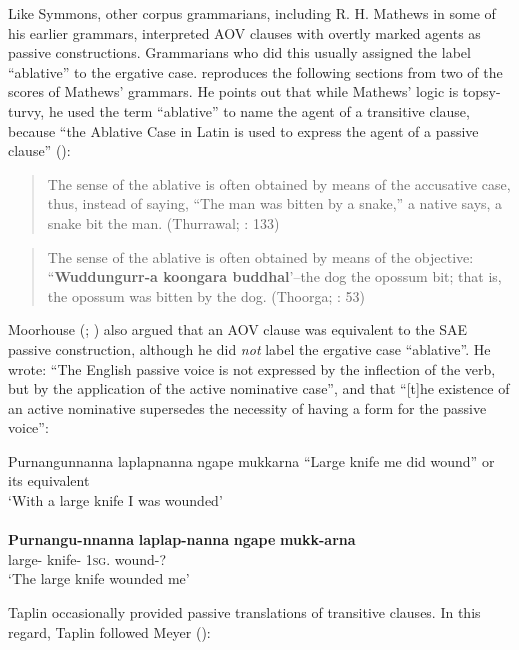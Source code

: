 Like Symmons, other corpus grammarians, including R. H. Mathews in some of his earlier grammars, interpreted AOV clauses with overtly marked agents as passive constructions. Grammarians who did this usually assigned the label “ablative” to the ergative case. \citet[193]{koch_r_2008} reproduces the following sections from two of the scores of Mathews' grammars. He points out that while Mathews' logic is topsy-turvy, he used the term “ablative” to name the agent of a transitive clause, because “the Ablative Case in Latin is used to express the agent of a passive clause” ():

\begin{quote}
The sense of the ablative is often obtained by means of the accusative case, thus, instead of saying, “The man was bitten by a snake,” a native says, a snake bit the man. (Thurrawal; \citealt{mathews_gundungurra_1901}: 133)
\end{quote}

\begin{quote}
The sense of the ablative is often obtained by means of the objective: “\textbf{Wud\-dungurr-a koongara buddhal}’–the dog the opossum bit; that is, the opossum was bitten by the dog. (Thoorga; \citealt{mathews_aboriginal_1902}: 53)
\end{quote}

Moorhouse (\citealt[24]{moorhouse_vocabulary_1846}; ) also argued that an AOV clause was equivalent to the SAE passive construction, although he did \textit{not} label the ergative case ``ablative''. He wrote: “The English passive voice is not expressed by the inflection of the verb, but by the application of the active nominative case”, and that “[t]he existence of an active nominative supersedes the necessity of having a form for the passive voice”:

\ea\label{ex:key:52}
	Purnangunnanna laplapnanna ngape mukkarna
	\glt “Large knife me did wound” or its equivalent \\ `With a large knife I was wounded' \\
	\citep[24]{moorhouse_vocabulary_1846} \\
	\gll \textbf{Purnangu-nnanna} \textbf{laplap-nanna} \textbf{ngape} \textbf{mukk-arna}\\
	large- knife-  1\textsc{sg}. wound-?\\
	\glt `The large knife wounded me'
\z

Taplin occasionally provided passive translations of transitive clauses. In this regard, Taplin followed Meyer ():

